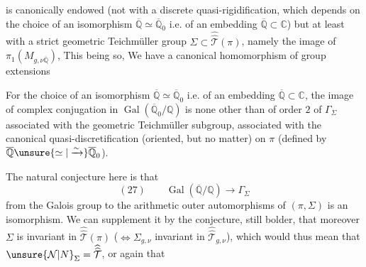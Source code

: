 
is canonically endowed (not with a discrete  quasi-rigidification, which depends on the choice of an isomorphism $\overline{\mathbb Q}\simeq\overline{\mathbb Q}_0$ i.e. of an embedding $\overline{\mathbb Q}\subset\mathbb C$) but at least with a strict geometric Teichmüller group $\Sigma\subset\widehat{\widehat{\mathcal T}}(\pi)$, namely the image of $\pi_1(M_{g,\nu\overline{\mathbb Q}})$,  This being so, We have a canonical homomorphism of group extensions


For the choice of an isomorphism $\overline{\mathbb Q}\simeq\overline{\mathbb Q}_0$ i.e. of an embedding $\overline{\mathbb Q}\subset\mathbb C$, the image of complex conjugation in $\operatorname{Gal}(\overline{\mathbb Q}_0/\mathbb Q)$ is none other than  of order $2$ of $\Gamma_\Sigma$ associated with the geometric Teichmüller subgroup, associated with the canonical quasi-discretification (oriented, but no matter) on $\pi$ (defined by $\overline{\mathbb Q}\unsure{\simeq|\xrightarrow{\sim}}\overline{\mathbb Q}_0$).


The natural conjecture here is that
\[
(27)\qquad \operatorname{Gal}(\overline{\mathbb Q}/\mathbb Q)\longrightarrow\Gamma_\Sigma
\]
from the Galois group to the arithmetic outer automorphisms of $(\pi,\Sigma)$ is an isomorphism. We can supplement it by the conjecture, still bolder, that moreover $\Sigma$ is invariant in $\widehat{\widehat{\mathcal T}}(\pi)$ ($\Longleftrightarrow\Sigma_{g,\nu}$ invariant in $\widehat{\widehat{\mathcal T}}_{g,\nu}$), which would thus mean that $\unsure{\mathcal N|N}_\Sigma=\widehat{\widehat{\mathcal T}}$, or again that 

